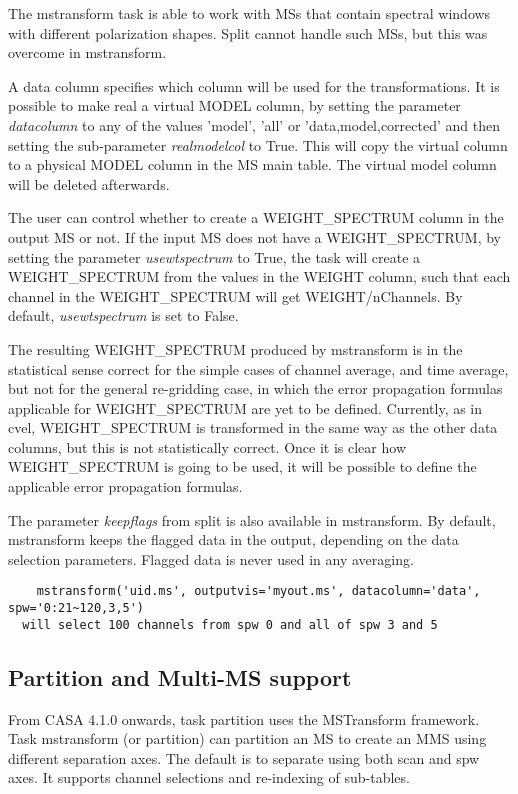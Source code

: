 The mstransform task is able to work with MSs that contain spectral windows with 
different polarization shapes. Split cannot handle such MSs, but this was overcome 
in mstransform.

A data column specifies which column will be used for the transformations. It is
possible to make real a virtual MODEL column, by setting the parameter
{\it datacolumn} to any of the values 'model', 'all' or 'data,model,corrected'
and then setting the sub-parameter {\it realmodelcol} to True. This will copy the virtual
column to a physical MODEL column in the MS main table. The virtual model column
will be deleted afterwards.

The user can control whether to create a WEIGHT_SPECTRUM column in the output MS or
not. If the input MS does not have a WEIGHT_SPECTRUM, by setting the parameter
{\it usewtspectrum} to True, the task will create a WEIGHT_SPECTRUM from the values
in the WEIGHT column, such that each channel in the WEIGHT_SPECTRUM will get WEIGHT/nChannels.
By default, {\it usewtspectrum} is set to False.

The resulting WEIGHT_SPECTRUM produced by mstransform is in the statistical sense 
correct for the simple cases of channel average, and time average, but not for the 
general re-gridding case, in which the error propagation formulas applicable for 
WEIGHT_SPECTRUM are yet to be defined. Currently, as in cvel, WEIGHT_SPECTRUM is 
transformed in the same way as the other data columns, but this is not statistically 
correct. Once it is clear how WEIGHT_SPECTRUM is going to be used, it will be possible 
to define the applicable error propagation formulas.

The parameter {\it keepflags} from split is also available in mstransform. By
default, mstransform keeps the flagged data in the output, depending on the data
selection parameters. Flagged data is never used in any averaging.

\begin{verbatim}
    mstransform('uid.ms', outputvis='myout.ms', datacolumn='data', spw='0:21~120,3,5')
  will select 100 channels from spw 0 and all of spw 3 and 5
\end{verbatim}

\subsection{Partition and Multi-MS support}
From CASA 4.1.0 onwards, task partition uses the MSTransform framework.
Task mstransform (or partition) can partition an MS to create an MMS using
different separation axes. The default is to separate using both scan and spw axes.
It supports channel selections and re-indexing of sub-tables. 

